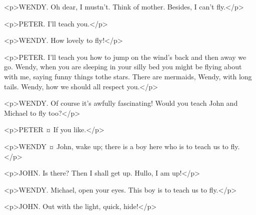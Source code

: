 <p>WENDY. Oh dear, I mustn't. Think of mother. Besides, I can't fly.</p>

<p>PETER. I'll teach you.</p>

<p>WENDY. How lovely to fly!</p>

<p>PETER. I'll teach you how to jump on the wind's back and then away we go. Wendy, when you are sleeping in your silly bed you might be flying about with me, saying funny things tothe stars. There are mermaids, Wendy, with long tails.
Wendy, how we should all respect you.</p>


<p>WENDY. Of course it's awfully fascinating! Would you teach John and Michael to fly too?</p>

<p>PETER ¤
If you like.</p>

<p>WENDY ¤
John, wake up; there is a boy here who is to teach us to fly.</p>

<p>JOHN. Is there? Then I shall get up.
Hullo, I am up!</p>

<p>WENDY. Michael, open your eyes. This boy is to teach us to fly.</p>


<p>JOHN. Out with the light, quick, hide!</p>



